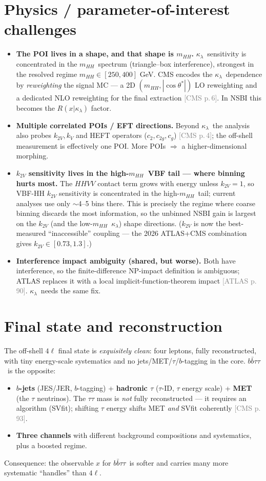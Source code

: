 \documentclass[11pt]{article}
\newcommand{\kl}{\ensuremath{\kappa_\lambda}}
\newcommand{\mhh}{\ensuremath{m_{HH}}}
\newcommand{\bbtt}{\ensuremath{b\bar b\tau\tau}}
\newcommand{\pA}[1]{\textcolor{gray}{\small[ATLAS p.\,#1]}}
\newcommand{\pC}[1]{\textcolor{gray}{\small[CMS p.\,#1]}}
\begin{document}
\section{Physics / parameter-of-interest challenges}
\begin{itemize}
\item \textbf{The POI lives in a shape, and that shape is \mhh.} \kl\ sensitivity is concentrated in the \mhh\
  spectrum (triangle--box interference), strongest in the resolved regime $\mhh\in[250,400]$ GeV. CMS encodes the
  \kl\ dependence by \emph{reweighting} the signal MC --- a 2D $(\mhh,|\cos\theta^*|)$ LO reweighting and a
  dedicated NLO reweighting for the final extraction \pC{6}. In NSBI this becomes the $R(x|\kl)$ factor.
\item \textbf{Multiple correlated POIs / EFT directions.} Beyond \kl\ the analysis also probes $k_{2V},k_V$ and
  HEFT operators ($c_2,c_{2g},c_g$) \pC{4}; the off-shell measurement is effectively one POI. More POIs $\Rightarrow$
  a higher-dimensional morphing.
\item \textbf{$k_{2V}$ sensitivity lives in the high-\mhh\ VBF tail --- where binning hurts most.} The $HHVV$
  contact term grows with energy unless $k_{2V}=1$, so VBF-HH $k_{2V}$ sensitivity is concentrated in the
  high-\mhh\ tail; current analyses use only $\sim$4--5 bins there. This is precisely the regime where coarse
  binning discards the most information, so the unbinned NSBI gain is largest on the $k_{2V}$ (and the low-\mhh\
  \kl) shape directions. ($k_{2V}$ is now the best-measured ``inaccessible'' coupling --- the 2026 ATLAS+CMS
  combination gives $k_{2V}\in[0.73,1.3]$.)
\item \textbf{Interference impact ambiguity (shared, but worse).} Both have interference, so the
  finite-difference NP-impact definition is ambiguous; ATLAS replaces it with a local implicit-function-theorem
  impact \pA{90}. \kl\ needs the same fix.
\end{itemize}

\section{Final state and reconstruction}
The off-shell $4\ell$ final state is \emph{exquisitely clean}: four leptons, fully reconstructed, with tiny
energy-scale systematics and no jets/MET/$\tau$/$b$-tagging in the core. \bbtt\ is the opposite:
\begin{itemize}
\item \textbf{$b$-jets} (JES/JER, $b$-tagging) + \textbf{hadronic $\tau$} ($\tau$-ID, $\tau$ energy scale) +
  \textbf{MET} (the $\tau$ neutrinos). The $\tau\tau$ mass is \emph{not} fully reconstructed --- it requires an
  algorithm (SVfit); shifting $\tau$ energy shifts MET \emph{and} SVfit coherently \pC{93}.
\item \textbf{Three channels} with different background compositions and systematics, plus a boosted regime.
\end{itemize}
Consequence: the observable $x$ for \bbtt\ is softer and carries many more systematic ``handles'' than $4\ell$.
\end{document}
